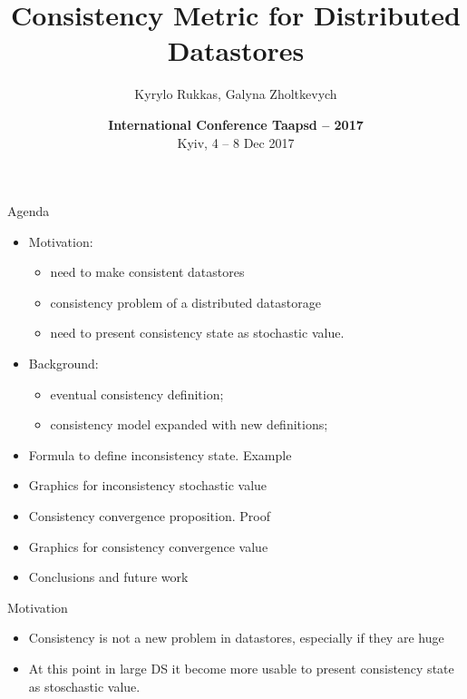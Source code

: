 \documentclass[aspectratio=43]{beamer}
\begin{document}
\title{Consistency Metric for Distributed Datastores}
\author{Kyrylo Rukkas, Galyna Zholtkevych}
\date{{\bfseries International Conference Taapsd -- 2017}\\
	Kyiv, 4 -- 8 Dec 2017} 
% 
\frame{\titlepage} 
\begin{frame}{Agenda}
\begin{itemize}
\item Motivation:

\begin{itemize}
\item need to make consistent datastores
\item consistency problem of a distributed datastorage
\item need to present consistency state as stochastic value.
\end{itemize}

\item Background:

\begin{itemize}
\item eventual consistency definition;
\item consistency model expanded with new definitions;
\end{itemize}

\item Formula to define inconsistency state. Example
\item Graphics for inconsistency stochastic value
\item Consistency convergence proposition. Proof
\item Graphics for consistency convergence value
\item Conclusions and future work

\end{itemize}
\end{frame}


\begin{frame}{Motivation}
\begin{itemize}
\item Consistency is not a new problem in datastores, especially if they are huge
\item At this point in large DS it become more usable to present consistency state as stoschastic value.

\end{itemize}
\end{frame}
\end{document}
